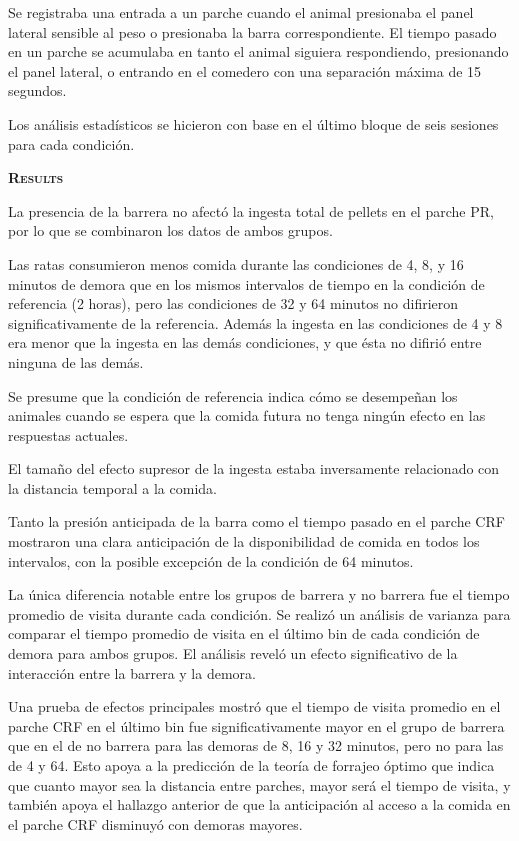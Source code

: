 \documentclass[a4paper,12pt]{article}
\begin{document}
Se registraba una entrada a un parche cuando el animal presionaba el panel lateral sensible al peso o presionaba la barra correspondiente. El tiempo pasado en un parche se acumulaba en tanto el animal siguiera respondiendo, presionando el panel lateral, o entrando en el comedero con una separación máxima de 15 segundos.

Los análisis estadísticos se hicieron con base en el último bloque de seis sesiones para cada condición.

{\scshape\bfseries Results}

La presencia de la barrera no afectó la ingesta total de pellets en el parche PR, por lo que se combinaron los datos de ambos grupos.

Las ratas consumieron menos comida durante las condiciones de 4, 8, y 16 minutos de demora que en los mismos intervalos de tiempo en la condición de referencia (2 horas), pero las condiciones de 32 y 64 minutos no difirieron significativamente de la referencia. Además la ingesta en las condiciones de 4 y 8 era menor que la ingesta en las demás condiciones, y que ésta no difirió entre ninguna de las demás.

Se presume que la condición de referencia indica cómo se desempeñan los animales cuando se espera que la comida futura no tenga ningún efecto en las respuestas actuales.

El tamaño del efecto supresor de la ingesta estaba inversamente relacionado con la distancia temporal a la comida.

Tanto la presión anticipada de la barra como el tiempo pasado en el parche CRF mostraron una clara anticipación de la disponibilidad de comida en todos los intervalos, con la posible excepción de la condición de 64 minutos.

La única diferencia notable entre los grupos de barrera y no barrera fue el tiempo promedio de visita durante cada condición. Se realizó un análisis de varianza para comparar el tiempo promedio de visita en el último bin de cada condición de demora para ambos grupos. El análisis reveló un efecto significativo de la interacción entre la barrera y la demora.

Una prueba de efectos principales mostró que el tiempo de visita promedio en el parche CRF en el último bin fue significativamente mayor en el grupo de barrera que en el de no barrera para las demoras de 8, 16 y 32 minutos, pero no para las de 4 y 64. Esto apoya a la predicción de la teoría de forrajeo óptimo que indica que cuanto mayor sea la distancia entre parches, mayor será el tiempo de visita, y también apoya el hallazgo anterior de que la anticipación al acceso a la comida en el parche CRF disminuyó con demoras mayores.
\end{document}
